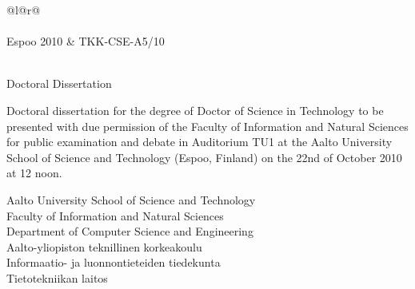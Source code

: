 {\sffamily\linespread{1.1}\selectfont\noindent
\begin{tabular*}{\textwidth}{@{}l@{\extracolsep{\fill}}r@{}}
\\
\\ 
\small Espoo 2010 & \small TKK-CSE-A5/10\\ 
\end{tabular*}}

\vspace{10em}

{\sffamily%
\setlength{\parindent}{0pt}%
\begin{doublespace}%
\Large\MakeUppercase{\distitle}\\
\normalsize Doctoral Dissertation
\end{doublespace}
\vspace{1em}

\textbf{\disauthor}
\vspace{3em}

\begin{onehalfspace}%
\footnotesize Doctoral dissertation for the degree of Doctor of Science in
Technology to be presented with due permission of the Faculty of Information
and Natural Sciences for public examination and debate in Auditorium TU1
at the Aalto University School of Science and Technology (Espoo, Finland) on
the 22nd of October 2010 at 12 noon.

\vfill

Aalto University School of Science and Technology\\
Faculty of Information and Natural Sciences\\
Department of Computer Science and Engineering\\

Aalto-yliopiston teknillinen korkeakoulu\\
Informaatio- ja luonnontieteiden tiedekunta\\
Tietotekniikan laitos
\end{onehalfspace}
}

\clearpage

\vspace*{16em}

